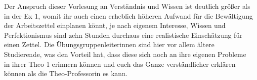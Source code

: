 Der Anspruch dieser Vorlesung an Verständnis und Wissen ist deutlich größer als in der \gls{Ex} 1, womit ihr auch einen erheblich höheren Aufwand für die Bewältigung der Arbeitszettel einplanen könnt, je nach eigenem Interesse, Wissen und Perfektionismus sind zehn Stunden durchaus eine realistische Einschätzung für einen Zettel. Die Übungsgruppenleiterinnen sind hier vor allem ältere Studierende, was den Vorteil hat, dass diese sich noch an ihre eigenen Probleme in ihrer \gls{Theo} 1 erinnern können und euch das Ganze verständlicher erklären können als die Theo-Professorin es kann.

\begin{figure}[b!]
\end{figure}

